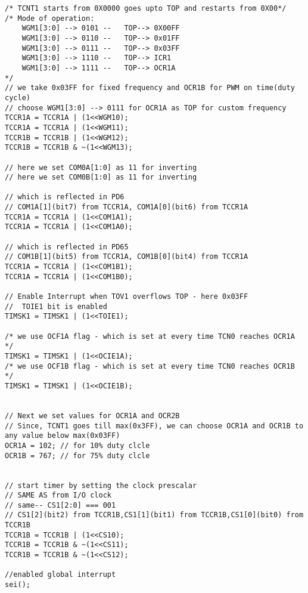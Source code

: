 \begin{verbatim}
/* TCNT1 starts from 0X0000 goes upto TOP and restarts from 0X00*/
/* Mode of operation:
    WGM1[3:0] --> 0101 --	TOP--> 0X00FF
    WGM1[3:0] --> 0110 --	TOP--> 0x01FF
    WGM1[3:0] --> 0111 --	TOP--> 0x03FF
    WGM1[3:0] --> 1110 --	TOP--> ICR1
    WGM1[3:0] --> 1111 --	TOP--> OCR1A
*/	
// we take 0x03FF for fixed frequency and OCR1B for PWM on time(duty cycle)	
// choose WGM1[3:0] --> 0111 for OCR1A as TOP for custom frequency
TCCR1A = TCCR1A | (1<<WGM10);
TCCR1A = TCCR1A | (1<<WGM11);
TCCR1B = TCCR1B | (1<<WGM12);
TCCR1B = TCCR1B & ~(1<<WGM13);

// here we set COM0A[1:0] as 11 for inverting
// here we set COM0B[1:0] as 11 for inverting

// which is reflected in PD6
// COM1A[1](bit7) from TCCR1A, COM1A[0](bit6) from TCCR1A
TCCR1A = TCCR1A | (1<<COM1A1);
TCCR1A = TCCR1A | (1<<COM1A0);

// which is reflected in PD65
// COM1B[1](bit5) from TCCR1A, COM1B[0](bit4) from TCCR1A	
TCCR1A = TCCR1A | (1<<COM1B1);
TCCR1A = TCCR1A | (1<<COM1B0);

// Enable Interrupt when TOV1 overflows TOP - here 0x03FF
//  TOIE1 bit is enabled
TIMSK1 = TIMSK1 | (1<<TOIE1);

/* we use OCF1A flag - which is set at every time TCN0 reaches OCR1A */
TIMSK1 = TIMSK1 | (1<<OCIE1A);
/* we use OCF1B flag - which is set at every time TCN0 reaches OCR1B */
TIMSK1 = TIMSK1 | (1<<OCIE1B);

        
// Next we set values for OCR1A and OCR2B
// Since, TCNT1 goes till max(0x3FF), we can choose OCR1A and OCR1B to any value below max(0x03FF)
OCR1A = 102; // for 10% duty clcle
OCR1B = 767; // for 75% duty clcle


// start timer by setting the clock prescalar
// SAME AS from I/O clock
// same-- CS1[2:0] === 001
// CS1[2](bit2) from TCCR1B,CS1[1](bit1) from TCCR1B,CS1[0](bit0) from TCCR1B
TCCR1B = TCCR1B | (1<<CS10);
TCCR1B = TCCR1B & ~(1<<CS11);
TCCR1B = TCCR1B & ~(1<<CS12);

//enabled global interrupt
sei();
\end{verbatim}


